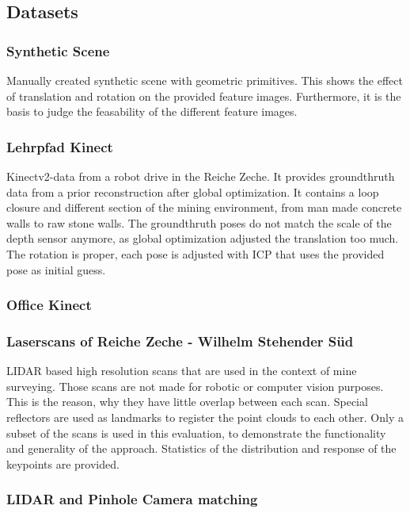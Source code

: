 \subsection{Datasets}
\subsubsection{Synthetic Scene}

Manually created synthetic scene with geometric primitives.
This shows the effect of translation and rotation on the provided feature images.
Furthermore, it is the basis to judge the feasability of the different feature images.

\subsubsection{Lehrpfad Kinect}

Kinectv2-data from a robot drive in the Reiche Zeche.
It provides groundthruth data from a prior reconstruction after global optimization.
It contains a loop closure and different section of the mining environment, from man made concrete walls to raw stone walls.
The groundthruth poses do not match the scale of the depth sensor anymore, as global optimization adjusted the translation too much.
The rotation is proper, each pose is adjusted with ICP that uses the provided pose as initial guess.

\subsubsection{Office Kinect}



\subsubsection{Laserscans of Reiche Zeche - Wilhelm Stehender Süd}

LIDAR based high resolution scans that are used in the context of mine surveying.
Those scans are not made for robotic or computer vision purposes.
This is the reason, why they have little overlap between each scan.
Special reflectors are used as landmarks to register the point clouds to each other.
Only a subset of the scans is used in this evaluation, to demonstrate the functionality and generality of the approach.
Statistics of the distribution and response of the keypoints are provided.

\subsubsection{LIDAR and Pinhole Camera matching}

